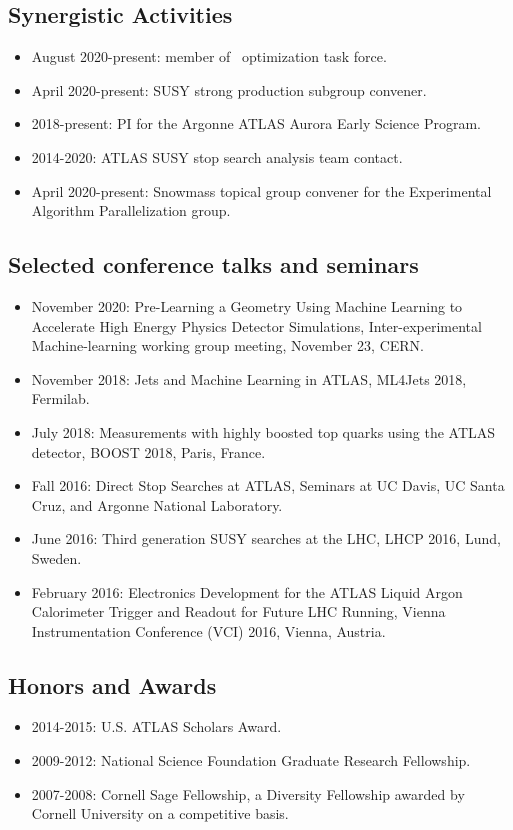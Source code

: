 \documentclass[letter, USenglish, 11pt, subfigure]{article}
\begin{document}
\subsection{Synergistic Activities}
\label{subsec:syn}
\begin{itemize}
\item August 2020-present: member of \GEANT\ optimization task force. %
\item April 2020-present: SUSY strong production subgroup convener. %
\item 2018-present: PI for the Argonne ATLAS Aurora Early Science Program.
\item 2014-2020: ATLAS SUSY stop search analysis team contact.
\item April 2020-present: Snowmass topical group convener for the Experimental Algorithm Parallelization group.
\end{itemize}

\subsection{Selected conference talks and seminars}
\begin{itemize}
\item November 2020: Pre-Learning a Geometry Using Machine Learning to Accelerate High Energy Physics Detector Simulations, Inter-experimental Machine-learning working group meeting, November 23, CERN.
\item November 2018: Jets and Machine Learning in ATLAS, ML4Jets 2018, Fermilab.
\item July 2018: Measurements with highly boosted top quarks using the ATLAS detector, BOOST 2018, Paris, France.
\item Fall 2016: Direct Stop Searches at ATLAS, Seminars at UC Davis, UC Santa Cruz, and Argonne National Laboratory.
\item June 2016: Third generation SUSY searches at the LHC, LHCP 2016, Lund, Sweden.
\item February 2016: Electronics Development for the ATLAS Liquid Argon Calorimeter Trigger and Readout for Future LHC Running, Vienna Instrumentation Conference (VCI) 2016, Vienna, Austria.
\end{itemize}

\subsection{Honors and Awards}
\begin{itemize}
\item 2014-2015: U.S. ATLAS Scholars Award.
\item 2009-2012: National Science Foundation Graduate Research Fellowship.
\item 2007-2008: Cornell Sage Fellowship, a Diversity Fellowship awarded by Cornell University on a competitive basis.
\end{itemize}
\end{document}

